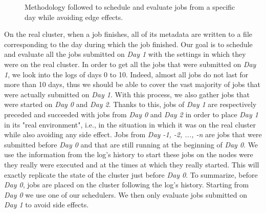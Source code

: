 \documentclass[conference,10pt]{IEEEtran}
\begin{document}
\begin{figure}[tb]
{
}
\caption{Methodology followed to schedule and evaluate jobs from a specific day while avoiding edge effects.}\label{fig.workload}
\label{fig.ex}
\end{figure}
On the real cluster, when a job finishes, all of its metadata
are written to a file corresponding to the day during which the job finished.
Our goal is to schedule and evaluate all the jobs submitted on 
\textit{Day 1} with the settings in which they were on the real cluster.
In order to get all the jobs that were submitted on \textit{Day 1}, we
look into the logs of days 0 to 10. Indeed, almost all jobs do not last for more than 10 days,
thus we should be able to cover the vast majority of jobs that were actually submitted on 
\textit{Day 1}.
With this process, we also gather jobs that were started on \textit{Day 0} and \textit{Day 2}. 
Thanks to this, jobs of \textit{Day 1} are respectively preceded and succeeded with jobs from \textit{Day 0}
and \textit{Day 2} in order to place \textit{Day 1} in its "real environment",
i.e., in the situation in which it was on the real cluster while also avoiding any side effect.
Jobs from \textit{Day -1, -2, ..., -n} are jobs that were submitted before \textit{Day 0} and that are still running at the beginning of \textit{Day 0}.
We use the information from the log's history to start these jobs on the nodes
were they really were executed and at the times at which they really started.
This will exactly replicate the state of the cluster just before \textit{Day 0}.
To summarize, before \textit{Day 0}, jobs are placed on the cluster
following the log's history. Starting from \textit{Day 0} we 
use one of our schedulers. We then only evaluate jobs submitted on \textit{Day 1}
to avoid side effects.
\end{document}
